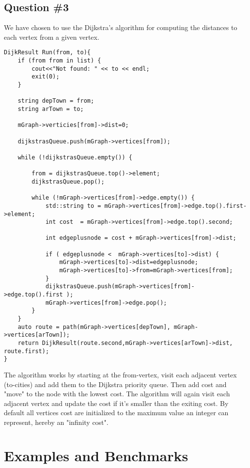 \subsection{Question \#3}
We have chosen to use the Dijkstra's algorithm for computing the distances to each vertex from a given vertex.
\bigskip
\begin{lstlisting}
DijkResult Run(from, to){
	if (from from in list) {
		cout<<"Not found: " << to << endl;
		exit(0);
	}

	string depTown = from;
	string arTown = to;

	mGraph->verticies[from]->dist=0;

	dijkstrasQueue.push(mGraph->vertices[from]);

	while (!dijkstrasQueue.empty()) {

		from = dijkstrasQueue.top()->element;
		dijkstrasQueue.pop();

		while (!mGraph->vertices[from]->edge.empty()) {
			std::string to = mGraph->vertices[from]->edge.top().first->element;
			int cost  = mGraph->vertices[from]->edge.top().second;

			int edgeplusnode = cost + mGraph->vertices[from]->dist;

			if ( edgeplusnode <  mGraph->vertices[to]->dist) {
				mGraph->vertices[to]->dist=edgeplusnode;
				mGraph->vertices[to]->from=mGraph->vertices[from];
			}
			dijkstrasQueue.push(mGraph->vertices[from]->edge.top().first );
			mGraph->vertices[from]->edge.pop();
		}
	}
	auto route = path(mGraph->vertices[depTown], mGraph->vertices[arTown]);
	return DijkResult(route.second,mGraph->vertices[arTown]->dist, route.first);
}
\end{lstlisting}
\bigskip
The algorithm works by starting at the from-vertex, visit each adjacent vertex (to-cities) and add them to the Dijkstra priority queue. Then add cost and "move" to the node with the lowest cost.
The algorithm will again visit each adjacent vertex and update the cost if it's smaller than the exiting cost.
By default all vertices cost are initialized to the maximum value an integer can represent, hereby an "infinity cost".

\section{Examples and Benchmarks}
